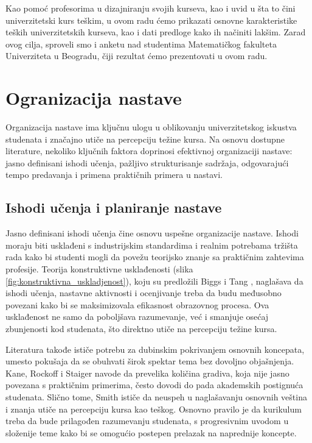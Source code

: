 \documentclass[a4paper]{article}
\begin{document}
Kao pomoć profesorima u dizajniranju svojih kurseva, kao i uvid u šta to čini univerzitetski kurs teškim, u ovom radu ćemo prikazati osnovne karakteristike teških univerzitetskih kurseva, kao i dati predloge kako ih načiniti lakšim. Zarad ovog cilja, sproveli smo i anketu nad studentima Matematičkog fakulteta Univerziteta u Beogradu, čiji rezultat ćemo prezentovati u ovom radu.

\section{Ogranizacija nastave}
Organizacija nastave ima ključnu ulogu u oblikovanju univerzitetskog iskustva studenata i
značajno utiče na percepciju težine kursa. Na osnovu dostupne literature, nekoliko ključnih
faktora doprinosi efektivnoj organizaciji nastave: jasno definisani ishodi učenja, pažljivo
strukturisanje sadržaja, odgovarajući tempo predavanja i primena praktičnih primera u
nastavi.

\subsection{Ishodi učenja i planiranje nastave}
Jasno definisani ishodi učenja čine osnovu uspešne organizacije nastave. Ishodi moraju biti
usklađeni s industrijskim standardima i realnim potrebama tržišta rada kako bi studenti mogli
da povežu teorijsko znanje sa praktičnim zahtevima profesije. Teorija konstruktivne
usklađenosti (slika \ref{fig:konstruktivna_uskladjenost}), koju su predložili Biggs i Tang \cite{biggs2007teaching}, naglašava da ishodi učenja, nastavne
aktivnosti i ocenjivanje treba da budu međusobno povezani kako bi se maksimizovala
efikasnost obrazovnog procesa. Ova usklađenost ne samo da poboljšava razumevanje, već i
smanjuje osećaj zbunjenosti kod studenata, što direktno utiče na percepciju težine kursa.

Literatura takođe ističe potrebu za dubinskim pokrivanjem osnovnih koncepata, umesto
pokušaja da se obuhvati širok spektar tema bez dovoljno objašnjenja. Kane, Rockoff i
Staiger \cite{kane2006certification} navode da prevelika količina gradiva, koja nije jasno povezana s praktičnim
primerima, često dovodi do pada akademskih postignuća studenata. Slično tome, Smith
\cite{smith2009simulation} ističe da neuspeh u naglašavanju osnovnih veština i znanja utiče na percepciju kursa
kao teškog. Osnovno pravilo je da kurikulum treba da bude prilagođen razumevanju
studenata, s progresivnim uvodom u složenije teme kako bi se omogućio postepen prelazak
na naprednije koncepte.
\end{document}
